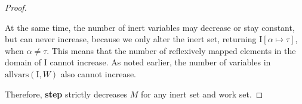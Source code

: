 \documentclass[10pt, letterpaper, oneside]{article}
\newcommand{\inertset}{\text{I}}
\begin{document}
\begin{proof}
\begin{itemize}
\begin{itemize}
      At the same time, the number of inert variables may decrease or stay constant, but can never increase, because we only alter the inert set, returning \(\inertset[\alpha \mapsto \tau]\), when \(\alpha \ne \tau\). This means that the number of reflexively mapped elements in the domain of \(\inertset\) cannot increase. As noted earlier, the number of variables in \(\text{allvars}(\inertset, W)\) also cannot increase.

    \end{itemize}

  \end{itemize}

  Therefore, \textbf{step} strictly decreases \(M\) for any inert set and work set.
\end{proof}






\end{document}
